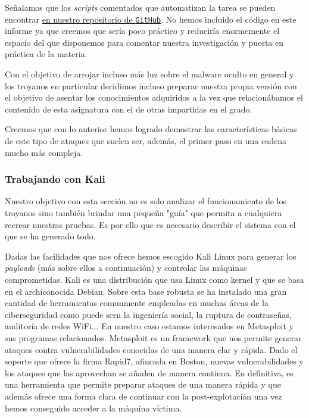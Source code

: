 \documentclass[12pt]{article}
\newcommand{\newpar} {
    \vskip 1cm
}
\begin{document}
            \newpar

            Señalamos que los \textit{scripts} comentados que automatizan la tarea se pueden encontrar \href{https://github.com/UAH-s-Telematics-Engineering-Tasks/info_sec_proj}{en nuestro repositorio de \texttt{GitHub}}. No hemos incluido el código en este informe ya que creemos que sería poco práctico y reduciría enormemente el espacio del que disponemos para comentar nuestra investigación y puesta en práctica de la materia.

            \newpar

            Con el objetivo de arrojar incluso más luz sobre el malware oculto en general y los troyanos en particular decidimos incluso preparar nuestra propia versión con el objetivo de asentar los conocimientos adquiridos a la vez que relacionábamos el contenido de esta asignatura con el de otras impartidas en el grado.

            \newpar

            Creemos que con lo anterior hemos logrado demostrar las características básicas de este tipo de ataques que suelen ser, además, el primer paso en una cadena mucho más compleja.

            \subsubsection{Trabajando con Kali}
                Nuestro objetivo con esta sección no es solo analizar el funcionamiento de los troyanos sino también brindar una pequeña "guía" que permita a cualquiera recrear nuestras pruebas. Es por ello que es necesario describir el sistema con el que se ha generado todo.

                \newpar

                Dadas las facilidades que nos ofrece hemos escogido Kali Linux para generar los \textit{payload}s (más sobre ellos a continuación) y controlar las máquinas comprometidas. Kali es una distribución que usa Linux como kernel y que se basa en el archiconocida Debian. Sobre esta base robusta se ha instalado una gran cantidad de herramientas comunmente empleadas en muchas áreas de la ciberseguridad como puede sern la ingeniería social, la ruptura de contraseñas, auditoría de redes WiFi... En nuestro caso estamos interesados en Metasploit y sus programas relacionados. Metasploit es un framework que nos permite generar ataques contra vulnerabilidades conocidas de una manera clar y rápida. Dado el soporte que ofrece la firma Rapid7, afincada en Boston, nuevas vulnerabilidades y los ataques que las aprovechan se añaden de manera continua. En definitiva, es una herramienta que permite preparar ataques de una manera rápida y que además ofrece una forma clara de continuar con la post-explotación una vez hemos conseguido acceder a la máquina víctima.
\end{document}
